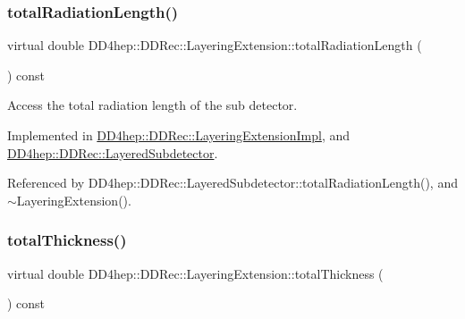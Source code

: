\hypertarget{class_d_d4hep_1_1_d_d_rec_1_1_layering_extension_a710dca345926458ed3ab3abc06490ee9}{}\label{class_d_d4hep_1_1_d_d_rec_1_1_layering_extension_a710dca345926458ed3ab3abc06490ee9} 
\subsubsection{\texorpdfstring{total\+Radiation\+Length()}{totalRadiationLength()}}
{\footnotesize\ttfamily virtual double D\+D4hep\+::\+D\+D\+Rec\+::\+Layering\+Extension\+::total\+Radiation\+Length (\begin{DoxyParamCaption}{ }\end{DoxyParamCaption}) const\hspace{0.3cm}{\ttfamily [pure virtual]}}



Access the total radiation length of the sub detector. 



Implemented in \hyperlink{class_d_d4hep_1_1_d_d_rec_1_1_layering_extension_impl_a69e58dff3608dc58cab88f9542b9317e}{D\+D4hep\+::\+D\+D\+Rec\+::\+Layering\+Extension\+Impl}, and \hyperlink{class_d_d4hep_1_1_d_d_rec_1_1_layered_subdetector_a2534d1e99f8d2f33aa28398fac9810b2}{D\+D4hep\+::\+D\+D\+Rec\+::\+Layered\+Subdetector}.



Referenced by D\+D4hep\+::\+D\+D\+Rec\+::\+Layered\+Subdetector\+::total\+Radiation\+Length(), and $\sim$\+Layering\+Extension().

\hypertarget{class_d_d4hep_1_1_d_d_rec_1_1_layering_extension_a287dd58b108f5d121bc55c91009454ed}{}\label{class_d_d4hep_1_1_d_d_rec_1_1_layering_extension_a287dd58b108f5d121bc55c91009454ed} 
\subsubsection{\texorpdfstring{total\+Thickness()}{totalThickness()}}
{\footnotesize\ttfamily virtual double D\+D4hep\+::\+D\+D\+Rec\+::\+Layering\+Extension\+::total\+Thickness (\begin{DoxyParamCaption}{ }\end{DoxyParamCaption}) const\hspace{0.3cm}{\ttfamily [pure virtual]}}



